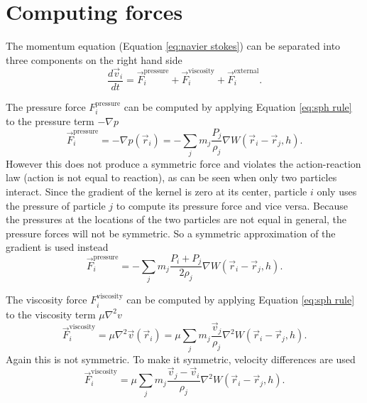 \documentclass[a4paper, 12pt, oneside]{book}
\begin{document}
\section{Computing forces}
\begin{doublespace}
    The momentum equation (Equation \ref{eq:navier stokes}) can be separated into three components on the right hand side
    \begin{equation}
        \frac{d\vec{v}_i}{dt} = \vec{F}^{\mathrm{pressure}}_i + \vec{F}^{\mathrm{viscosity}}_i + \vec{F}^{\mathrm{external}}_i.
    \end{equation}
    
    The pressure force \(F^{\mathrm{pressure}}_i\) can be computed by applying Equation \ref{eq:sph rule} to the pressure term \(- \nabla p\)
    \begin{equation}
        \label{eq:pressure force not symmetric}
        \vec{F}_{i}^{\mathrm{pressure}} = - \nabla p(\vec{r}_{i}) = - \sum_{j} m_{j} \frac{P_{j}} {\rho_{j}} \nabla W(\vec{r}_{i} - \vec{r}_{j}, h).
    \end{equation}
    However this does not produce a symmetric force and violates the action-reaction law (action is not equal to reaction), as can be seen when only two particles interact. Since the gradient of the kernel is zero at its center, particle \(i\) only uses the pressure of particle \(j\) to compute its pressure force and vice versa. Because the pressures at the locations of the two particles are not equal in general, the pressure forces will not be symmetric. So a symmetric approximation of the gradient is used instead \cite{muller2003}
    \begin{equation}
        \label{eq:pressure force}
        \vec{F}_{i}^{\mathrm{pressure}} = - \sum_{j} m_{j} \frac{P_{i} + P_{j}} {2 \rho_{j}} \nabla W(\vec{r}_{i} - \vec{r}_{j}, h) .
    \end{equation}
    
    The viscosity force \(F^{\mathrm{viscosity}}_i\) can be computed by applying Equation \ref{eq:sph rule} to the viscosity term \(\mu \nabla^{2} v\)
    \begin{equation}
        \vec{F}_{i}^{\mathrm{viscosity}} = \mu \nabla^{2} \vec{v}(\vec{r}_{i}) = \mu \sum_{j} m_{j} \frac{\vec{v}_{j}} {\rho_{j}} \nabla^{2} W(\vec{r}_{i} - \vec{r}_{j}, h) .
    \end{equation}
    Again this is not symmetric. To make it symmetric, velocity differences are used \cite{muller2003}
    \begin{equation}
        \label{eq:viscosity force}
        \vec{F}_{i}^{\mathrm{viscosity}} = \mu \sum_{j} m_{j} \frac{\vec{v}_{j} - \vec{v}_{i}} {\rho_{j}} \nabla^{2} W(\vec{r}_{i} - \vec{r}_{j}, h) .
    \end{equation}
\end{doublespace}
\end{document}
